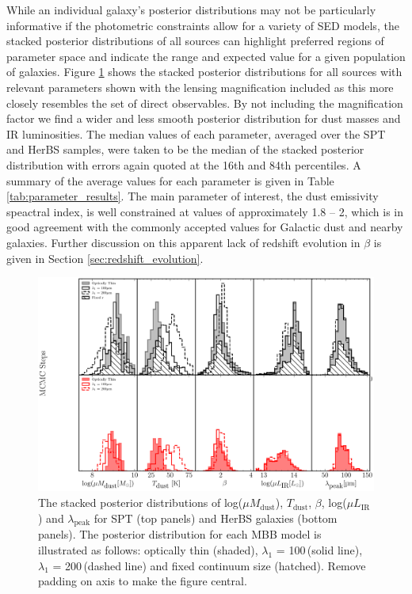 While an individual galaxy's posterior distributions may not be particularly informative if the photometric constraints allow for a variety of SED models, the stacked posterior distributions of all sources can highlight preferred regions of parameter space and indicate the range and expected value for a given population of galaxies. Figure \ref{fig:stacked_posteriors} shows the stacked posterior distributions for all sources with relevant parameters shown with the lensing magnification included as this more closely resembles the set of direct observables. By not including the magnification factor we find a wider and less smooth posterior distribution for dust masses and IR luminosities. The median values of each parameter, averaged over the SPT and HerBS samples, were taken to be the median of the stacked posterior distribution with errors again quoted at the 16th and 84th percentiles. A summary of the average values for each parameter is given in Table \ref{tab:parameter_results}. The main parameter of interest, the dust emissivity speactral index, is well constrained at values of approximately 1.8 -- 2, which is in good agreement with the commonly accepted values for Galactic dust and nearby galaxies. Further discussion on this apparent lack of redshift evolution in $\beta$ is given in Section \ref{sec:redshift_evolution}. 

\begin{figure}
	\centering
	\includegraphics[width=\columnwidth]{Figures/stacked_posterior.pdf}
	\caption{The stacked posterior distributions of log($\mu M_{\textrm{dust}}$), $T_{\textrm{dust}}$, $\beta$, log($\mu L_{\textrm{IR}}$) and $\lambda_{\textrm{peak}}$ for SPT (top panels) and HerBS galaxies (bottom panels). The posterior distribution for each MBB model is illustrated as follows: optically thin (shaded), $\lambda_1$ = 100\,\micron (solid line), $\lambda_1$ = 200\,\micron (dashed line) and fixed continuum size (hatched). {\color{red} Remove padding on axis to make the figure central.}}
	\label{fig:stacked_posteriors}
\end{figure}

